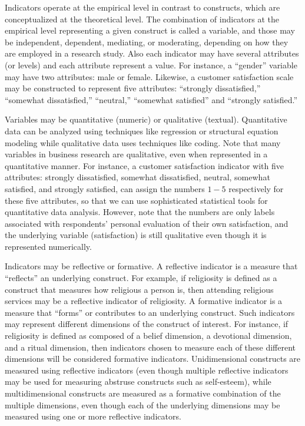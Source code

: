 Indicators operate at the empirical level in contrast to constructs, which are conceptualized at the theoretical level. The combination of indicators at the empirical level representing a given construct is called a \gls{variable}, and those may be independent, dependent, mediating, or moderating, depending on how they are employed in a research study. Also each indicator may have several attributes (or levels) and each attribute represent a value. For instance, a ``gender'' variable may have two attributes: male or female. Likewise, a customer satisfaction scale may be constructed to represent five attributes: ``strongly dissatisfied,'' ``somewhat dissatisfied,'' ``neutral,'' ``somewhat satisfied'' and ``strongly satisfied.'' 

Variables may be quantitative (numeric) or qualitative (textual). Quantitative data can be analyzed using techniques like regression or structural equation modeling while qualitative data uses techniques like coding. Note that many variables in business research are qualitative, even when represented in a quantitative manner. For instance, a customer satisfaction indicator with five attributes: strongly dissatisfied, somewhat dissatisfied, neutral, somewhat satisfied, and strongly satisfied, can assign the numbers $ 1-5 $ respectively for these five attributes, so that we can use sophisticated statistical tools for quantitative data analysis. However, note that the numbers are only labels associated with respondents' personal evaluation of their own satisfaction, and the underlying variable (satisfaction) is still qualitative even though it is represented numerically.

Indicators may be reflective or formative. A reflective indicator is a measure that ``reflects'' an underlying construct. For example, if religiosity is defined as a construct that measures how religious a person is, then attending religious services may be a reflective indicator of religiosity. A formative indicator is a measure that ``forms'' or contributes to an underlying construct. Such indicators may represent different dimensions of the construct of interest. For instance, if religiosity is defined as composed of a belief dimension, a devotional dimension, and a ritual dimension, then indicators chosen to measure each of these different dimensions will be considered formative indicators. Unidimensional constructs are measured using reflective indicators (even though multiple reflective indicators may be used for measuring abstruse constructs such as self-esteem), while multidimensional constructs are measured as a formative combination of the multiple dimensions, even though each of the underlying dimensions may be measured using one or more reflective indicators.


